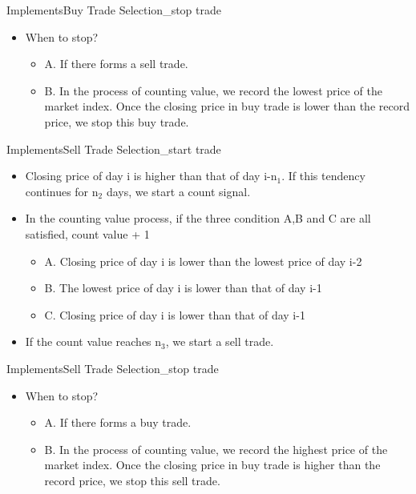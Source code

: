 \documentclass{beamer}
\begin{document}
\begin{frame}{Implements}{Buy Trade Selection_stop trade}
  \begin{itemize}
  \item<1->{
    When to stop?
	\begin{itemize}
  \item<2->{
    A. If there forms a sell trade.
  }
  \item<3->{
    B. In the process of counting value, we record the lowest price of the market index.
	Once the closing price in buy trade is lower than the record price, we stop this buy trade.
  }
    \end{itemize}
  }
  \end{itemize}
\end{frame}

\begin{frame}{Implements}{Sell Trade Selection_start trade}
  \begin{itemize}
  \item {
    Closing price of day i is higher than that of day i-n$_1$.
	If this tendency continues for n$_2$ days, we start a count signal.
	\pause
  }
  \item {
    In the counting value process, if the three condition A,B and C are all satisfied, count value + 1
  \begin{itemize}
  \item<3->{
    A. Closing price of day i is lower than the lowest price of day i-2
  }
  \item<4->{
    B. The lowest price of day i is lower than that of day i-1
  }
  \item<5->{
    C. Closing price of day i is lower than that of day i-1
  }
  \end{itemize}
  }
  \item<6->{
    If the count value reaches n$_3$, we start a sell trade.
  }
  \end{itemize}
\end{frame}

\begin{frame}{Implements}{Sell Trade Selection_stop trade}
  \begin{itemize}
  \item<7->{
    When to stop?
	\begin{itemize}
  \item<8->{
    A. If there forms a buy trade.
  }
  \item<9->{
    B. In the process of counting value, we record the highest price of the market index.
	Once the closing price in buy trade is higher than the record price, we stop this sell trade.
  }
    \end{itemize}
  }
  \end{itemize}
\end{frame}
\end{document}
